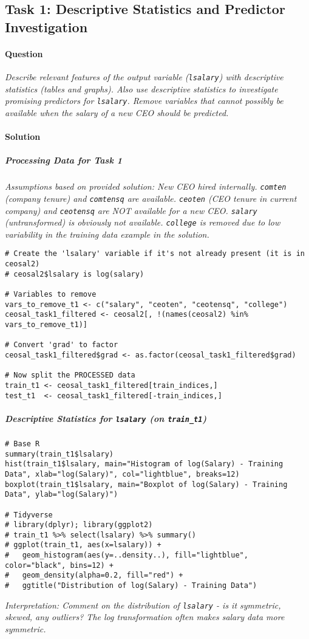 \documentclass[12pt,a4paper]{article}
\newcommand{\Rcode}[1]{\texttt{#1}} %
\begin{document}
    \subsection{Task 1: Descriptive Statistics and Predictor Investigation}
        \paragraph{Question}
        \textit{Describe relevant features of the output variable (\Rcode{lsalary}) with descriptive statistics (tables and graphs). Also use descriptive statistics to investigate promising predictors for \Rcode{lsalary}. Remove variables that cannot possibly be available when the salary of a new CEO should be predicted.}

        \paragraph{Solution}
            \subparagraph{Processing Data for Task 1}
                \textit{Assumptions based on provided solution: New CEO hired internally. \Rcode{comten} (company tenure) and \Rcode{comtensq} are available. \Rcode{ceoten} (CEO tenure in current company) and \Rcode{ceotensq} are NOT available for a new CEO. \Rcode{salary} (untransformed) is obviously not available. \Rcode{college} is removed due to low variability in the training data example in the solution.}
\begin{lstlisting}[caption={Data processing for Task 1 (Applied to whole dataset first, then split)}]
# Create the 'lsalary' variable if it's not already present (it is in ceosal2)
# ceosal2$lsalary is log(salary)

# Variables to remove
vars_to_remove_t1 <- c("salary", "ceoten", "ceotensq", "college")
ceosal_task1_filtered <- ceosal2[, !(names(ceosal2) %in% vars_to_remove_t1)]

# Convert 'grad' to factor
ceosal_task1_filtered$grad <- as.factor(ceosal_task1_filtered$grad)

# Now split the PROCESSED data
train_t1 <- ceosal_task1_filtered[train_indices,]
test_t1  <- ceosal_task1_filtered[-train_indices,]
\end{lstlisting}

            \subparagraph{Descriptive Statistics for \Rcode{lsalary} (on \Rcode{train\_t1})}
\begin{lstlisting}
# Base R
summary(train_t1$lsalary)
hist(train_t1$lsalary, main="Histogram of log(Salary) - Training Data", xlab="log(Salary)", col="lightblue", breaks=12)
boxplot(train_t1$lsalary, main="Boxplot of log(Salary) - Training Data", ylab="log(Salary)")

# Tidyverse
# library(dplyr); library(ggplot2)
# train_t1 %>% select(lsalary) %>% summary()
# ggplot(train_t1, aes(x=lsalary)) + 
#   geom_histogram(aes(y=..density..), fill="lightblue", color="black", bins=12) + 
#   geom_density(alpha=0.2, fill="red") +
#   ggtitle("Distribution of log(Salary) - Training Data")
\end{lstlisting}
            \textit{Interpretation: Comment on the distribution of \Rcode{lsalary} - is it symmetric, skewed, any outliers? The log transformation often makes salary data more symmetric.}
\end{document}
